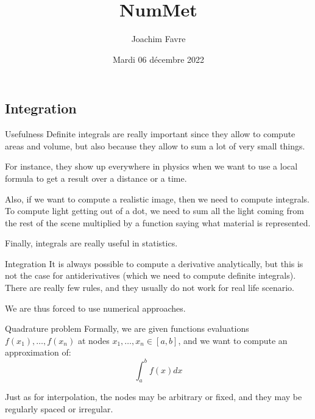 \documentclass[a4paper]{article}
\title{NumMet}
\author{Joachim Favre}
\date{Mardi 06 décembre 2022}
\begin{document}
\maketitle


\subsection{Integration}
\begin{parag}{Usefulness}
    Definite integrals are really important since they allow to compute areas and volume, but also because they allow to sum a lot of very small things.

    For instance, they show up everywhere in physics when we want to use a local formula to get a result over a distance or a time.

    Also, if we want to compute a realistic image, then we need to compute integrals. To compute light getting out of a dot, we need to sum all the light coming from the rest of the scene multiplied by a function saying what material is represented.

    Finally, integrals are really useful in statistics.
\end{parag}

\begin{parag}{Integration}
    It is always possible to compute a derivative analytically, but this is not the case for antiderivatives (which we need to compute definite integrals). There are really few rules, and they usually do not work for real life scenario.

    We are thus forced to use numerical approaches.
\end{parag}

\begin{parag}{Quadrature problem}
    Formally, we are given functions evaluations $f\left(x_1\right), \ldots, f\left(x_n\right)$ at nodes $x_1, \ldots, x_n \in \left[a, b\right]$, and we want to compute an approximation of: 
    \[\int_{a}^{b} f\left(x\right)dx\]
    
    Just as for interpolation, the nodes may be arbitrary or fixed, and they may be regularly spaced or irregular.
\end{parag}
\end{document}
